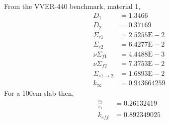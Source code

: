   From the VVER-440 benchmark, material 1,
  \begin{align*}
    D_1 &= 1.3466  \\
    D_2 &= 0.37169 \\
    \Sigma_{r1} &= 2.5255\text{E}-2\\
    \Sigma_{r2} &= 6.4277\text{E}-2\\
    \nu \Sigma_{f1}  &= 4.4488\text{E}-3\\
    \nu \Sigma_{f2}  &= 7.3753\text{E}-2\\
    \Sigma_{s1\rightarrow2} &= 1.6893\text{E}-2 \\
    k_{\infty} &= 0.943664259
  \end{align*}
  For a 100cm slab then,
  \begin{align*}
    \frac{c_2}{c_1} &= 0.26132419 \\
    k_{eff} &= 0.892349025
  \end{align*}
